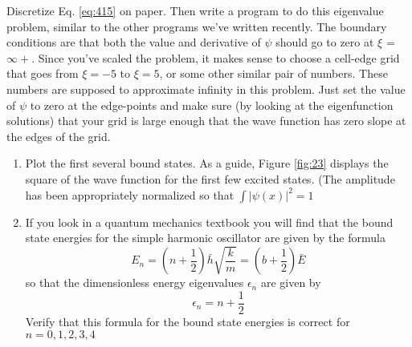 \begin{problem} \label{P4.4}
Discretize Eq. \ref{eq:415} on paper. Then write a program to do this eigenvalue
problem, similar to the other programs we\rq ve written recently. The boundary conditions are that both the value and derivative of $\psi$ should go to zero
at $\xi$ = $\infty +$. Since you\rq ve scaled the problem, it makes sense to choose a
cell-edge grid that goes from $\xi =  - 5$ to $\xi  = 5$, or some other similar pair
of numbers. These numbers are supposed to approximate infinity in this
problem. Just set the value of $\psi$ to zero at the edge-points and make sure
(by looking at the eigenfunction solutions) that your grid is large enough
that the wave function has zero slope at the edges of the grid.


\begin{enumerate}[label=(\alph*)]
\item Plot the first several bound states. As a guide, Figure \ref{fig:23} displays the square
of the wave function for the first few excited states. (The amplitude has
been appropriately normalized so that $ \int |ψ(x)|^2 = 1$
\item  If you look in a quantum mechanics textbook you will find that the bound
state energies for the simple harmonic oscillator are given by the formula
\begin{equation}\label{eq:416}
E_n = (n + \frac{1}{2}) \bar{h}\sqrt{\frac{k}{m}} =(b+\frac{1}{2})\bar{E}
\end{equation}
so that the dimensionless energy eigenvalues $\epsilon_n$ are given by
\begin{equation}\label{eq:417}
\epsilon_n = n + \frac{1}{2}
\end{equation}
Verify that this formula for the bound state energies is correct for $n =
0,1,2,3,4$

\end{enumerate}
\end{problem}

